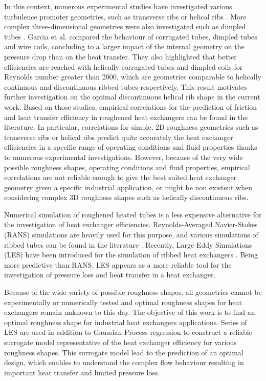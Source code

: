 In this context, numerous experimental studies have investigated various turbulence promoter geometries, such as transverse ribs \cite{webb1971, aliaga1994} or helical ribs \cite{gee1980, VicenteGarciaViedma2004, cheng2006, Mayo2016}. More complex three-dimensional geometries were also investigated such as dimpled tubes \cite{VicenteGarciaViedma2002}. Garcia et al. \cite{GarciaSolanoVicenteEtAl2012} compared the behaviour of corrugated tubes, dimpled tubes and wire coils, concluding to a larger impact of the internal geometry on the pressure drop than on the heat transfer. They also highlighted that better efficiencies are reached with helically corrugated tubes and dimpled coils for Reynolds number greater than 2000, which are geometries comparable to helically continuous and discontinuous ribbed tubes respectively. This result motivates further investigation on the optimal discontinuous helical rib shape in the current work. Based on those studies, empirical correlations for the prediction of friction and heat transfer efficiency in roughened heat exchangers can be found in the literature. In particular, correlations for simple, 2D roughness geometries such as transverse ribs or helical ribs predict quite accurately the heat exchanger efficiencies in a specific range of operating conditions and fluid properties thanks to numerous experimental investigations. However, because of the very wide possible roughness shapes, operating conditions and fluid properties, empirical correlations are not reliable enough to give the best suited heat exchanger geometry given a specific industrial application, or might be non existent when considering complex 3D roughness shapes such as helically discontinuous ribs.

Numerical simulation of roughened heated tubes is a less expensive alternative for the investigation of heat exchanger efficiencies. Reynolds-Averaged Navier-Stokes (RANS) simulations are heavily used for this purpose, and various simulations of ribbed tubes can be found in the literature \cite{liou1993, shub1993, liu2001, ooi2002, iaccarino2002, liou2002, kim2004, kim_hm2004, ryu2007_a, ryu2007_b, kamali2008, eiamsaard2008, agra2011, ma2012}. Recently, Large Eddy Simulations (LES) have been introduced for the simulation of ribbed heat exchangers \cite{jordan2003, vijiapurapu2007, vijiapurapu2010, Zhu2015, campet2018}. Being more predictive than RANS, LES appears as a more reliable tool for the investigation of pressure loss and heat transfer in a heat exchanger.

Because of the wide variety of possible roughness shapes, all geometries cannot be experimentally or numerically tested and optimal roughness shapes for heat exchangers remain unknown to this day. The objective of this work is to find an optimal roughness shape for industrial heat exchangers applications. Series of LES are used in addition to Gaussian Process regression \cite{rasmussen2006} to construct a reliable surrogate model representative of the heat exchanger efficiency for various roughness shapes. This surrogate model lead to the prediction of an optimal design, which enables to understand the complex flow behaviour resulting in important heat transfer and limited pressure loss.

